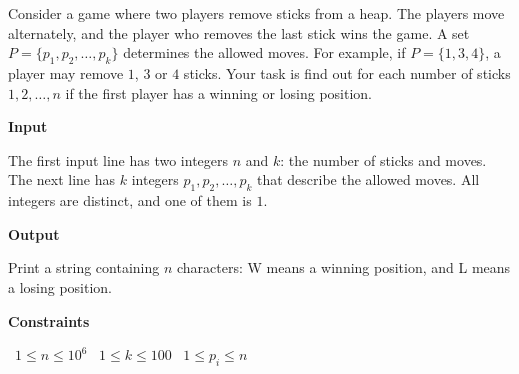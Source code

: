 Consider a game where two players remove sticks from a heap. The players move alternately, and the player who removes the last stick wins the game.
A set $P=\{p_1,p_2,\ldots,p_k\}$ determines the allowed moves. For example, if $P=\{1,3,4\}$, a player may remove $1$, $3$ or $4$ sticks.
Your task is find out for each number of sticks $1,2,\dots,n$ if the first player has a winning or losing position.

\vspace{0.3cm}\noindent\textbf{Input}

The first input line has two integers $n$ and $k$: the number of sticks and moves.
The next line has $k$ integers $p_1,p_2,\dots,p_k$ that describe the allowed moves. All integers are distinct, and one of them is $1$.

\vspace{0.3cm}\noindent\textbf{Output}

Print a string containing $n$ characters: W means a winning position, and L means a losing position.

\vspace{0.3cm}\noindent\textbf{Constraints}

\textbullet\ $1 \le n \le 10^6$
\textbullet\ $1 \le k \le 100$
\textbullet\ $1 \le p_i \le n$